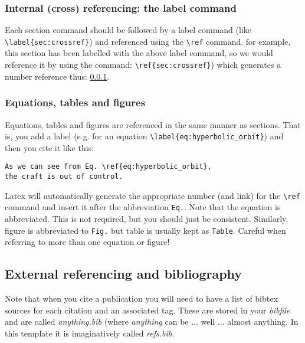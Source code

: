 \subsubsection{Internal (cross) referencing: the {\sc label} command}
\label{sec:crossref}
Each section command should be followed by a label command
(like \verb|\label{sec:crossref}|) and referenced using
the \verb|\ref| command. for example, this section has
been labelled with the above label command, so we would 
reference it by using the command: \verb|\ref{sec:crossref}|)
which generates a number reference thus: \ref{sec:crossref}.

\subsubsection{Equations, tables and figures}
Equations, tables and figures are referenced in the same manner as sections. That is, you add a label (e.g. for an equation
\verb|\label{eq:hyperbolic_orbit}|) and then you cite it like this:
\begin{verbatim}
As we can see from Eq. \ref{eq:hyperbolic_orbit}, 
the craft is out of control.
\end{verbatim}
Latex will automatically generate the appropriate number (and link) for the
\verb|\ref| command and insert it after the abbreviation 
\verb|Eq.|. Note that the equation is abbreviated. This is not required, but you should just be consistent. Similarly, figure is
abbreviated to \verb|Fig.| but table is usually kept as \verb|Table|. Careful when referring to more than one equation or figure!
 

\subsection{External referencing and bibliography}

Note that when you cite a publication you will need to have a list of bibtex sources for each citation and an associated tag. These are stored 
in your {\it bibfile} and are called {\it anything.bib} 
(where {\it anything} can be ... well ... almost anything. In this 
template it is imaginatively called {\it refs.bib}.
\par


